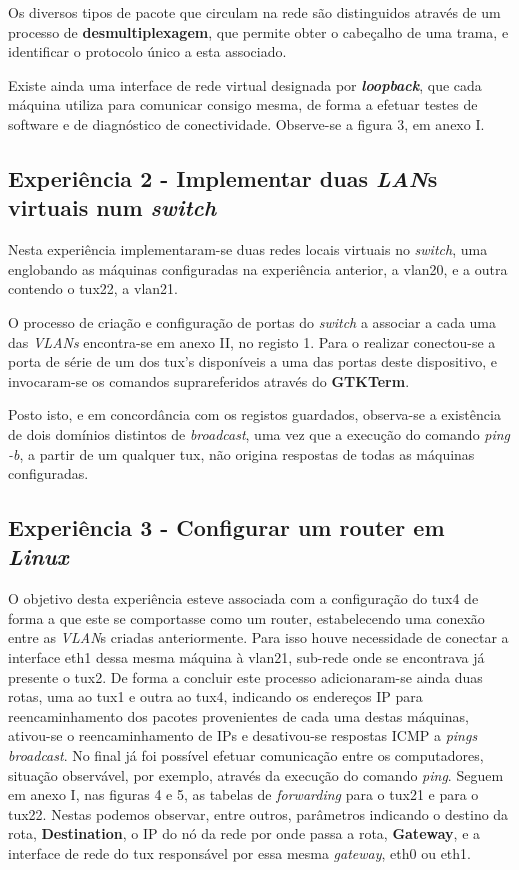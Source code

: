 \documentclass[a4paper, 11pt]{article}
\begin{document}
Os diversos tipos de pacote que circulam na rede são distinguidos através de um processo de \textbf{desmultiplexagem}, que permite obter o cabeçalho de uma trama, e identificar o protocolo único a esta associado.

Existe ainda uma interface de rede virtual designada por \textit{\textbf{loopback}}, que cada máquina utiliza para comunicar consigo mesma, de forma a efetuar testes de software e de diagnóstico de conectividade. Observe-se a figura 3, em anexo I.

\subsection{Experiência 2 - Implementar duas \textit{LAN}s virtuais num \textit{switch}}

Nesta experiência implementaram-se duas redes locais virtuais no \textit{switch}, uma englobando as máquinas configuradas na experiência anterior, a vlan20, e a outra contendo o tux22, a vlan21.

O processo de criação e configuração de portas do \textit{switch} a associar a cada uma das \textit{VLANs} encontra-se em anexo II, no registo 1. Para o realizar conectou-se a porta de série de um dos tux's disponíveis a uma das portas deste dispositivo, e invocaram-se os comandos suprareferidos através do \textbf{GTKTerm}. 

Posto isto, e em concordância com os registos guardados, observa-se a existência de dois domínios distintos de \textit{broadcast}, uma vez que a execução do comando \textit{ping -b}, a partir de um qualquer tux, não origina respostas de todas as máquinas configuradas.

\subsection{Experiência 3 - Configurar um router em \textit{Linux}}

O objetivo desta experiência esteve associada com a configuração do tux4 de forma a que este se comportasse como um router, estabelecendo uma conexão entre as \textit{VLAN}s criadas anteriormente.
Para isso houve necessidade de conectar a interface eth1 dessa mesma máquina à vlan21, sub-rede onde se encontrava já presente o tux2. De forma a concluir este processo adicionaram-se ainda duas rotas, uma ao tux1 e outra ao tux4, indicando os endereços IP para reencaminhamento dos pacotes provenientes de cada uma destas máquinas, ativou-se o reencaminhamento de IPs e desativou-se respostas ICMP a \textit{pings broadcast}.
No final já foi possível efetuar comunicação entre os computadores, situação observável, por exemplo, através da execução do comando \textit{ping}. Seguem em anexo I, nas figuras 4 e 5, as tabelas de \textit{forwarding} para o tux21 e para o tux22. Nestas podemos observar, entre outros, parâmetros indicando o destino da rota, \textbf{Destination}, o IP do nó da rede por onde passa a rota, \textbf{Gateway}, e a interface de rede do tux responsável por essa mesma \textit{gateway}, eth0 ou eth1.
\end{document}
